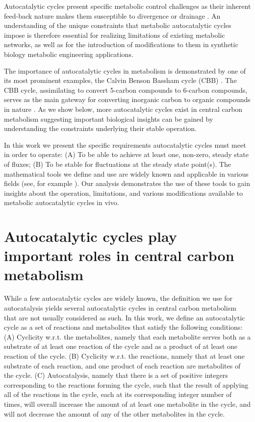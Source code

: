 \documentclass[a4page,notitlepage]{article}
\begin{document}
    Autocatalytic cycles present specific metabolic control challenges as their inherent feed-back nature makes them susceptible to divergence or drainage \cite{Fell1999,Reznik2010-te}.
    An understanding of the unique constraints that metabolic autocatalytic cycles impose is therefore essential for realizing limitations of existing metabolic networks, as well as for the introduction of modifications to them in synthetic biology metabolic engineering applications.

    The importance of autocatalytic cycles in metabolism is demonstrated by one of its most prominent examples, the Calvin Benson Bassham cycle (CBB) \cite{Benson1950-cl}.
    The CBB cycle, assimilating  to convert 5-carbon compounds to 6-carbon compounds, serves as the main gateway for converting inorganic carbon to organic compounds in nature \cite{Raven2012-le}.
    As we show below, more autocatalytic cycles exist in central carbon metabolism suggesting important biological insights can be gained by understanding the constraints underlying their stable operation.

    In this work we present the specific requirements autocatalytic cycles must meet in order to operate: (A) To be able to achieve at least one, non-zero, steady state of fluxes; 
    (B) To be stable for fluctuations at the steady state point(s).
    The mathematical tools we define and use are widely known and applicable in various fields (see, for example \cite{Strogatz2014-hp}).
    Our analysis demonstrates the use of these tools to gain insights about the operation, limitations, and various modifications available to metabolic autocatalytic cycles in vivo.



\section{Autocatalytic cycles play important roles in central carbon metabolism}

While a few autocatalytic cycles are widely known, the definition we use for autocatalysis yields several autocatalytic cycles in central carbon metabolism that are not usually considered as such.
In this work, we define an autocatalytic cycle as a set of reactions and metabolites that satisfy the following conditions:
(A) Cyclicity w.r.t. the metabolites, namely that each metabolite serves both as a substrate of at least one reaction of the cycle and as a product of at least one reaction of the cycle.
(B) Cyclicity w.r.t. the reactions, namely that at least one substrate of each reaction, and one product of each reaction are metabolites of the cycle.
(C) Autocatalysis, namely that there is a set of positive integers corresponding to the reactions forming the cycle, such that the result of applying all of the reactions in the cycle, each at its corresponding integer number of times, will overall increase the amount of at least one metabolite in the cycle, and will not decrease the amount of any of the other metabolites in the cycle.
\end{document}
